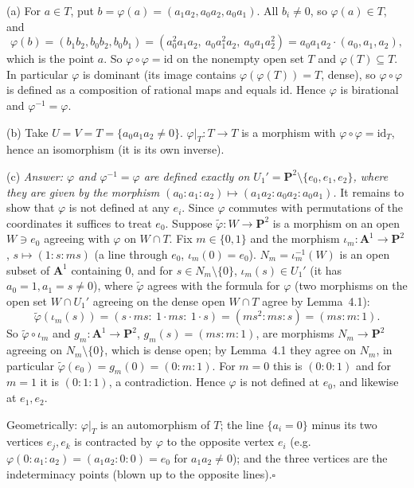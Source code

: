 \documentclass[11pt]{article}
\begin{document}
(a) For $a\in T$, put $b=\varphi(a)=(a_1a_2,a_0a_2,a_0a_1)$. All $b_i\ne0$, so $\varphi(a)\in T$, and
\[
\varphi(b)=(b_1b_2,b_0b_2,b_0b_1)=(a_0^2a_1a_2,\ a_0a_1^2a_2,\ a_0a_1a_2^2)=a_0a_1a_2\cdot(a_0,a_1,a_2),
\]
which is the point $a$. So $\varphi\circ\varphi=\mathrm{id}$ on the nonempty open set $T$ and $\varphi(T)\subseteq T$. In particular $\varphi$ is dominant (its image contains $\varphi(\varphi(T))=T$, dense), so $\varphi\circ\varphi$ is defined as a composition of rational maps and equals $\mathrm{id}$. Hence $\varphi$ is birational and $\varphi^{-1}=\varphi$.

(b) Take $U=V=T=\{a_0a_1a_2\ne0\}$. $\varphi|_T:T\to T$ is a morphism with $\varphi\circ\varphi=\mathrm{id}_T$, hence an isomorphism (it is its own inverse).

(c) \emph{Answer: $\varphi$ and $\varphi^{-1}=\varphi$ are defined exactly on $U_1'=\mathbf P^2\setminus\{e_0,e_1,e_2\}$, where they are given by the morphism $(a_0:a_1:a_2)\mapsto(a_1a_2:a_0a_2:a_0a_1)$.} It remains to show that $\varphi$ is not defined at any $e_i$. Since $\varphi$ commutes with permutations of the coordinates it suffices to treat $e_0$. Suppose $\tilde\varphi:W\to\mathbf P^2$ is a morphism on an open $W\ni e_0$ agreeing with $\varphi$ on $W\cap T$. Fix $m\in\{0,1\}$ and the morphism $\iota_m:\mathbf A^1\to\mathbf P^2$, $s\mapsto(1:s:ms)$ (a line through $e_0$, $\iota_m(0)=e_0$). $N_m=\iota_m^{-1}(W)$ is an open subset of $\mathbf A^1$ containing $0$, and for $s\in N_m\setminus\{0\}$, $\iota_m(s)\in U_1'$ (it has $a_0=1,a_1=s\ne0$), where $\tilde\varphi$ agrees with the formula for $\varphi$ (two morphisms on the open set $W\cap U_1'$ agreeing on the dense open $W\cap T$ agree by Lemma~4.1):
\[
\tilde\varphi(\iota_m(s))=(s\cdot ms:\ 1\cdot ms:\ 1\cdot s)=(ms^2:ms:s)=(ms:m:1).
\]
So $\tilde\varphi\circ\iota_m$ and $g_m:\mathbf A^1\to\mathbf P^2$, $g_m(s)=(ms:m:1)$, are morphisms $N_m\to\mathbf P^2$ agreeing on $N_m\setminus\{0\}$, which is dense open; by Lemma~4.1 they agree on $N_m$, in particular $\tilde\varphi(e_0)=g_m(0)=(0:m:1)$. For $m=0$ this is $(0:0:1)$ and for $m=1$ it is $(0:1:1)$, a contradiction. Hence $\varphi$ is not defined at $e_0$, and likewise at $e_1,e_2$.

Geometrically: $\varphi|_T$ is an automorphism of $T$; the line $\{a_i=0\}$ minus its two vertices $e_j,e_k$ is contracted by $\varphi$ to the opposite vertex $e_i$ (e.g.\ $\varphi(0:a_1:a_2)=(a_1a_2:0:0)=e_0$ for $a_1a_2\ne0$); and the three vertices are the indeterminacy points (blown up to the opposite lines).\hfill$\square$
\end{document}
